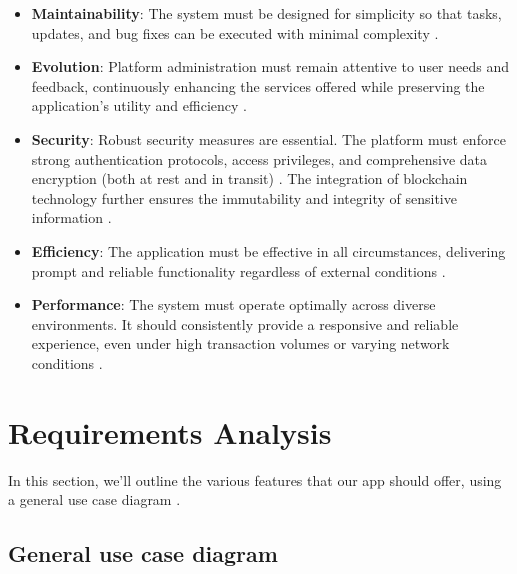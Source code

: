\begin{itemize}
    \item \textbf{Maintainability}: The system must be designed for simplicity so that tasks, updates, and bug fixes can be executed with minimal complexity \cite{DevOpsFoundation2023, FowlerRefactoring2018}.
    
    \item \textbf{Evolution}: Platform administration must remain attentive to user needs and feedback, continuously enhancing the services offered while preserving the application's utility and efficiency \cite{PoppendieckLean2012, KnibergLeanStartup2013}.
    
    \item \textbf{Security}: Robust security measures are essential. The platform must enforce strong authentication protocols, access privileges, and comprehensive data encryption (both at rest and in transit) \cite{ClerkAuthenticationDocs, OWASPSecurityPrinciples2021}. The integration of blockchain technology further ensures the immutability and integrity of sensitive information \cite{WangBlockchainRealEstate2023, McKinseyBlockchainRE2023}.
    
    \item \textbf{Efficiency}: The application must be effective in all circumstances, delivering prompt and reliable functionality regardless of external conditions \cite{KimDevOpsMethods2018, BassArchitecture2021}.
    
    \item \textbf{Performance}: The system must operate optimally across diverse environments. It should consistently provide a responsive and reliable experience, even under high transaction volumes or varying network conditions \cite{DockerArchitecture2023, ForsgreniDevOpsMetrics2023}.
\end{itemize} 

\section{Requirements Analysis}

In this section, we'll outline the various features that our app should offer, using a general use case diagram \cite{CockburnUML2002}.

\subsection{General use case diagram}

